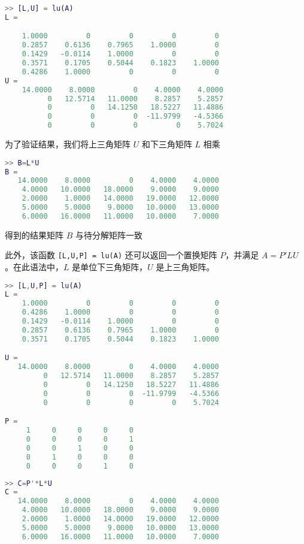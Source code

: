 \begin{lstlisting}[language=Matlab]  
>> [L,U] = lu(A)
L =

    1.0000         0         0         0         0
    0.2857    0.6136    0.7965    1.0000         0
    0.1429   -0.0114    1.0000         0         0
    0.3571    0.1705    0.5044    0.1823    1.0000
    0.4286    1.0000         0         0         0
U =
    14.0000    8.0000         0    4.0000    4.0000
          0   12.5714   11.0000    8.2857    5.2857
          0         0   14.1250   18.5227   11.4886
          0         0         0  -11.9799   -4.5366
          0         0         0         0    5.7024
\end{lstlisting}

为了验证结果，我们将上三角矩阵 $U$ 和下三角矩阵 $L$ 相乘
\begin{lstlisting}[language=Matlab]  
>> B=L*U
B =
   14.0000    8.0000         0    4.0000    4.0000
    4.0000   10.0000   18.0000    9.0000    9.0000
    2.0000    1.0000   14.0000   19.0000   12.0000
    5.0000    5.0000    9.0000   10.0000   13.0000
    6.0000   16.0000   11.0000   10.0000    7.0000
\end{lstlisting}
得到的结果矩阵 $B$ 与待分解矩阵一致


此外，该函数 \lstinline|[L,U,P] = lu(A)| 还可以返回一个置换矩阵 $P$，并满足 $A = P'LU$。在此语法中，$L$ 是单位下三角矩阵，$U$ 是上三角矩阵。
\begin{lstlisting}[language=Matlab]  
>> [L,U,P] = lu(A)
L =
    1.0000         0         0         0         0
    0.4286    1.0000         0         0         0
    0.1429   -0.0114    1.0000         0         0
    0.2857    0.6136    0.7965    1.0000         0
    0.3571    0.1705    0.5044    0.1823    1.0000

U =
   14.0000    8.0000         0    4.0000    4.0000
         0   12.5714   11.0000    8.2857    5.2857
         0         0   14.1250   18.5227   11.4886
         0         0         0  -11.9799   -4.5366
         0         0         0         0    5.7024

P =
     1     0     0     0     0
     0     0     0     0     1
     0     0     1     0     0
     0     1     0     0     0
     0     0     0     1     0
\end{lstlisting}

\begin{lstlisting}[language=Matlab]  
>> C=P'*L*U
C =
   14.0000    8.0000         0    4.0000    4.0000
    4.0000   10.0000   18.0000    9.0000    9.0000
    2.0000    1.0000   14.0000   19.0000   12.0000
    5.0000    5.0000    9.0000   10.0000   13.0000
    6.0000   16.0000   11.0000   10.0000    7.0000
\end{lstlisting}



